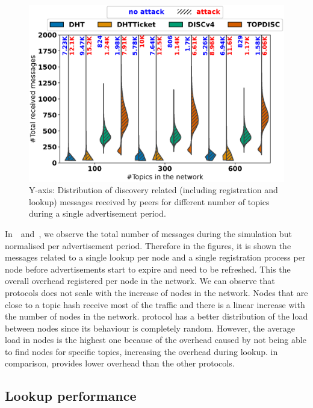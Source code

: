 \begin{figure}
\centering
\includegraphics[width=\linewidth]{results/split/topic_totalMsg.eps}
\caption{Y-axis: Distribution of discovery related (including registration and lookup) messages received by peers for different number of topics during a single advertisement period.}
\label{fig:msgsPerTopic}
\end{figure}

In~~and~, we observe the total number of messages during the simulation but normalised per advertisement period. 
Therefore in the figures, it is shown the messages related to a single lookup per node and a single registration process per node before advertisements start to expire and need to be refreshed.
This the overall overhead registered per node in the network.
We can observe that \altname protocols does not scale with the increase of nodes in the network. 
Nodes that are close to a topic hash receive most of the traffic and there is a linear increase with the number of nodes in the network. 
\discv protocol has a better distribution of the load between nodes since its behaviour is completely random. However, the average load in nodes is the highest one because of the overhead caused by not being able to find nodes for specific topics, increasing the overhead during lookup.
\sysname in comparison, provides lower overhead than the other protocols.

\subsection{Lookup performance}

